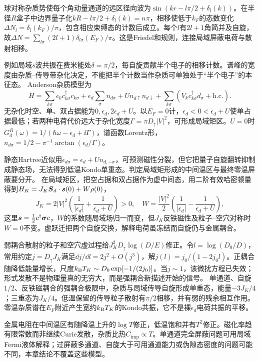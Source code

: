 \label{ch:kondo}
球对称杂质势使每个角动量通道的远区径向波为$\sin(kr-l\pi/2+\delta_l(k))$。在半径$R$盒子中边界量子化$kR-l\pi/2+\delta_l(k)=n\pi$，相移使低于$k_F$的态数变化$\Delta N_l=\delta_l(k_F)/\pi$，包含相应束缚态的计数后成立。每个$l$有$2l+1$角简并及自旋，故$\Delta N=\sum_{l\sigma}(2l+1)\delta_{l\sigma}(E_F)/\pi$。这是Friedel和规则，连接局域屏蔽电荷与散射相移。

例如局域$s$波共振在费米能处$\delta=\pi/2$，每自旋贡献半个电子的相移计数。谱峰的宽度由杂质--传导带杂化决定，不能把半个计数当作杂质可单独处于“半个电子”的本征态。
Anderson杂质模型为
\begin{equation}
H=\sum_{k\sigma}\epsilon_kc_{k\sigma}^\dagger c_{k\sigma}+\epsilon_d\sum_\sigma n_{d\sigma}+Un_{d\uparrow}n_{d\downarrow}+\sum_{k\sigma}(V_kc_{k\sigma}^\dagger d_\sigma+\mathrm{h.c.}).
\end{equation}
无杂化时空、单、双占据能为$0,\epsilon_d,2\epsilon_d+U$。以$E_F=0$计，$\epsilon_d<0<\epsilon_d+U$使单占据最低；若两种电荷代价远大于杂化宽度$\Gamma=\pi D_\uparrow|V|^2$，可形成局域矩区。$U=0$时$G_d^R(\omega)=1/(\hbar\omega-\epsilon_d+\ii\Gamma)$，谱函数Lorentz形，$n_{d\sigma}=1/2-\pi^{-1}\arctan(\epsilon_d/\Gamma)$。

静态Hartree近似用$\epsilon_{d\sigma}=\epsilon_d+Un_{d,-\sigma}$，可预测磁性分裂，但它把量子自旋翻转抑制成静态场，无法得到低温Kondo单重态。判定局域矩形成的中间温区与最终零温屏蔽要分开。
在局域矩区，把空占据和双占据作为虚中间态，用二阶有效哈密顿量得到$H_K=J_K\boldsymbol{S}_d\cdot\boldsymbol{s}(0)+W\rho(0)$，
\begin{equation}
J_K=2|V|^2\left(\frac1{|\epsilon_d|}+\frac1{\epsilon_d+U}\right)>0,\quad
W=\frac{|V|^2}{2}\left(\frac1{|\epsilon_d|}-\frac1{\epsilon_d+U}\right),
\end{equation}
这里$\boldsymbol{s}=\frac12c^\dagger\boldsymbol{\sigma} c$，$W$的系数随局域场归一而变，但$J_K$反铁磁性及粒子--空穴对称时$W=0$不变。虚跃迁把两个自旋交换，解释电荷虽冻结而自旋仍与金属耦合。

弱耦合散射的粒子和空穴虚过程给$J_K^2D_\uparrow\log(D/E)$修正。令$l=\log(D_0/D)$，常用约定$j=D_\uparrow J_K$满足$\dd j/\dd l=2j^2+O(j^3)$，解$j(l)=j_0/(1-2j_0l)$。正耦合随降低能量增长，尺度$k_{\mathrm B} T_K\sim D_0\exp[-1/(2j_0)]$。当$j\sim1$，该微扰方程已失效；形式发散不是物理量真的无穷大，而是强耦合新描述开始的信号。
单通道、自旋$1/2$、反铁磁耦合的强耦合极限中，杂质与局域传导自旋形成单重态，能量$-3J_K/4$；三重态为$J_K/4$。低温保留的传导粒子散射有$\pi/2$相移，并有弱的残余相互作用。零温杂质谱在$E_F$附近产生宽约$k_{\mathrm B} T_K$的Kondo共振，它不是裸$\epsilon_d$电荷共振的平移。

金属电阻在中间温区有随降温上升的$\log T$修正，低温饱和并有$T^2$修正。磁化率趋有限常数而非继续Curie发散，杂质比热$C_{\mathrm{imp}}\propto T$。单通道完全屏蔽问题可用局域Fermi液体解释；过屏蔽多通道、自旋大于可用通道能力或伪隙态密度的问题可能不同，本章结论不覆盖这些模型。
